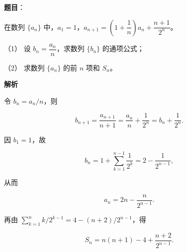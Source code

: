 \begin{answer}

\textbf{题目}：

在数列 $\{a_n\}$ 中，$a_1=1$，$a_{n+1}=\left(1+\dfrac1n\right)a_n+\dfrac{n+1}{2^n}$。

（1） 设 $b_n=\dfrac{a_n}{n}$，求数列 $\{b_n\}$ 的通项公式；

（2） 求数列 $\{a_n\}$ 的前 $n$ 项和 $S_n$。

\textbf{解析}


令 $b_n=a_n/n$，则

\nopagebreak[4]
\[
b_{n+1}=\frac{a_{n+1}}{n+1}
=\frac{a_n}{n}+\frac1{2^n}
=b_n+\frac1{2^n}.
\]


因 $b_1=1$，故

\nopagebreak[4]
\[
b_n=1+\sum_{k=1}^{n-1}\frac1{2^k}
=2-\frac1{2^{n-1}},
\]

从而

\nopagebreak[4]
\[
a_n=2n-\frac n{2^{n-1}}.
\]

再由 $\sum_{k=1}^n k/2^{k-1}=4-(n+2)/2^{n-1}$，得

\nopagebreak[4]
\[
S_n=n(n+1)-4+\frac{n+2}{2^{n-1}}.
\]



\end{answer}
